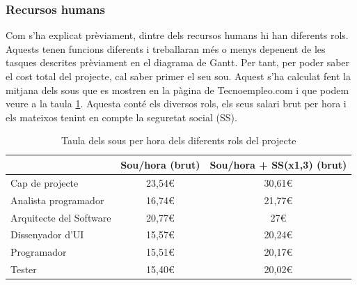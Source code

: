 \documentclass[a4paper]{article}
\begin{document}
\subsubsection{Recursos humans}
Com s'ha explicat prèviament, dintre dels recursos humans hi han diferents rols. Aquests tenen funcions diferents i treballaran més o menys depenent de les tasques descrites prèviament en el diagrama de Gantt. Per tant, per poder saber el cost total del projecte, cal saber primer el seu sou. Aquest s'ha calculat fent la  mitjana dels sous que es mostren en la pàgina de Tecnoempleo.com \cite{tecnoEmpleo} i que podem veure a la taula \ref{tab:TaulaSouRols}. Aquesta conté els diversos rols, els seus salari brut per hora i els mateixos tenint en compte la seguretat social (SS). 

\begin{table}[H]
    \begin{center}
        \begin{tabular}{|l|c|c|}
            \hline
            \rowcolor[HTML]{9B9B9B} 
            \multicolumn{1}{|c|}{\cellcolor[HTML]{9B9B9B}{\color[HTML]{000000} \textbf{Rol}}} & {\color[HTML]{000000} \textbf{Sou/hora (brut)}} & {\color[HTML]{000000} \textbf{Sou/hora + SS(x1,3) (brut)}} \\ \hline
            {\color[HTML]{000000} Cap de projecte}                                            & {\color[HTML]{000000} 23,54€}                   & {\color[HTML]{000000} 30,61€}                              \\ \hline
            {\color[HTML]{000000} Analista programador}                                       & {\color[HTML]{000000} 16,74€}                   & {\color[HTML]{000000} 21,77€}                              \\ \hline
            {\color[HTML]{000000} Arquitecte del Software}                                    & {\color[HTML]{000000} 20,77€}                   & {\color[HTML]{000000} 27€}                                 \\ \hline
            {\color[HTML]{000000} Dissenyador d'UI}                                           & {\color[HTML]{000000} 15,57€}                   & {\color[HTML]{000000} 20,24€}                              \\ \hline
            {\color[HTML]{000000} Programador}                                                & {\color[HTML]{000000} 15,51€}                   & {\color[HTML]{000000} 20,17€}                              \\ \hline
            {\color[HTML]{000000} Tester}                                                     & {\color[HTML]{000000} 15,40€}                   & {\color[HTML]{000000} 20,02€}                              \\ \hline
        \end{tabular}
        \caption{Taula dels sous per hora dels diferents rols del projecte}
        \label{tab:TaulaSouRols}
    \end{center}
\end{table}
\end{document}
